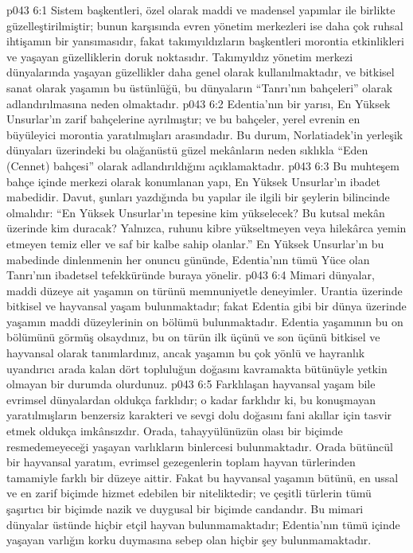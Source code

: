 \vs p043 6:1 Sistem başkentleri, özel olarak maddi ve madensel yapımlar ile birlikte güzelleştirilmiştir; bunun karşısında evren yönetim merkezleri ise daha çok ruhsal ihtişamın bir yansımasıdır, fakat takımyıldızların başkentleri morontia etkinlikleri ve yaşayan güzelliklerin doruk noktasıdır. Takımyıldız yönetim merkezi dünyalarında yaşayan güzellikler daha genel olarak kullanılmaktadır, ve bitkisel sanat olarak yaşamın bu üstünlüğü, bu dünyaların “Tanrı’nın bahçeleri” olarak adlandırılmasına neden olmaktadır.
\vs p043 6:2 Edentia’nın bir yarısı, En Yüksek Unsurlar’ın zarif bahçelerine ayrılmıştır; ve bu bahçeler, yerel evrenin en büyüleyici morontia yaratılmışları arasındadır. Bu durum, Norlatiadek’in yerleşik dünyaları üzerindeki bu olağanüstü güzel mekânların neden sıklıkla “Eden (Cennet) bahçesi” olarak adlandırıldığını açıklamaktadır.
\vs p043 6:3 Bu muhteşem bahçe içinde merkezi olarak konumlanan yapı, En Yüksek Unsurlar’ın ibadet mabedidir. Davut, şunları yazdığında bu yapılar ile ilgili bir şeylerin bilincinde olmalıdır: “En Yüksek Unsurlar’ın tepesine kim yükselecek? Bu kutsal mekân üzerinde kim duracak? Yalnızca, ruhunu kibre yükseltmeyen veya hilekârca yemin etmeyen temiz eller ve saf bir kalbe sahip olanlar.” En Yüksek Unsurlar’ın bu mabedinde dinlenmenin her onuncu gününde, Edentia’nın tümü Yüce olan Tanrı’nın ibadetsel tefekküründe buraya yönelir.
\vs p043 6:4 Mimari dünyalar, maddi düzeye ait yaşamın on türünü memnuniyetle deneyimler. Urantia üzerinde bitkisel ve hayvansal yaşam bulunmaktadır; fakat Edentia gibi bir dünya üzerinde yaşamın maddi düzeylerinin on bölümü bulunmaktadır. Edentia yaşamının bu on bölümünü görmüş olsaydınız, bu on türün ilk üçünü ve son üçünü bitkisel ve hayvansal olarak tanımlardınız, ancak yaşamın bu çok yönlü ve hayranlık uyandırıcı arada kalan dört topluluğun doğasını kavramakta bütünüyle yetkin olmayan bir durumda olurdunuz.
\vs p043 6:5 Farklılaşan hayvansal yaşam bile evrimsel dünyalardan oldukça farklıdır; o kadar farklıdır ki, bu konuşmayan yaratılmışların benzersiz karakteri ve sevgi dolu doğasını fani akıllar için tasvir etmek oldukça imkânsızdır. Orada, tahayyülünüzün olası bir biçimde resmedemeyeceği yaşayan varlıkların binlercesi bulunmaktadır. Orada bütüncül bir hayvansal yaratım, evrimsel gezegenlerin toplam hayvan türlerinden tamamiyle farklı bir düzeye aittir. Fakat bu hayvansal yaşamın bütünü, en ussal ve en zarif biçimde hizmet edebilen bir niteliktedir; ve çeşitli türlerin tümü şaşırtıcı bir biçimde nazik ve duygusal bir biçimde candandır. Bu mimari dünyalar üstünde hiçbir etçil hayvan bulunmamaktadır; Edentia’nın tümü içinde yaşayan varlığın korku duymasına sebep olan hiçbir şey bulunmamaktadır.
